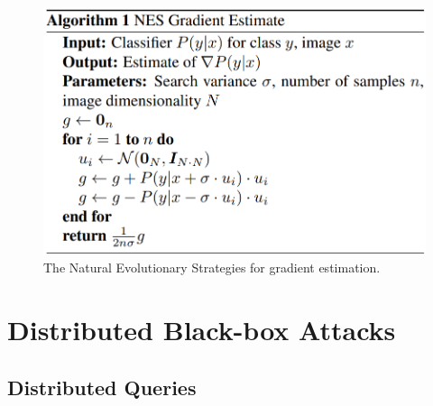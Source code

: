 \begin{figure}[H]
\centering
\includegraphics[scale=0.55]{figures/chapter_classification/nes.png}
\caption{The Natural Evolutionary Strategies for gradient estimation.}
\label{fig.nes}
\end{figure}

\section{Distributed Black-box Attacks}




\subsection{Distributed Queries}

